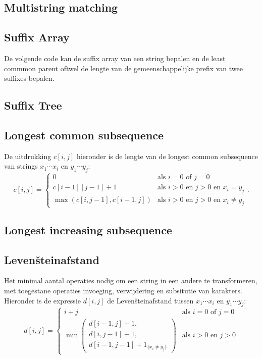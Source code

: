 \documentclass[10pt,a4paper,titlepage]{article}
\begin{document}


\subsection{Multistring matching}


\iftrue
\subsection{Suffix Array}

De volgende code kan de suffix array van een string bepalen en de least commmon parent oftwel de lengte van de gemeenschappelijke prefix van twee suffixes bepalen.



\subsection{Suffix Tree}



\subsection{Longest common subsequence}

De uitdrukking $c[i,j]$ hieronder is de lengte van de longest common subsequence van strings $x_1\cdots x_i$ en $y_1\cdots y_j$:
\[ c[i,j] = \left\{\begin{array}{ll}
0 & \text{als $i = 0$ of $j = 0$} \\
c[i-1][j-1] + 1 & \text{als $i > 0$ en $j > 0$ en $x_i = y_j$} \\
\max (c[i,j-1], c[i-1,j]) & \text{als $i > 0$ en $j > 0$ en $x_i \neq y_j$}
\end{array}\right. .
 \]

\subsection{Longest increasing subsequence}

\fi

\subsection{Levenšteinafstand}
Het minimal aantal operaties nodig om een string in een andere te transformeren, met toegestane operaties invoeging, verwijdering en subsitutie van karakters. Hieronder is de expressie $d[i,j]$ de Levenšteinafstand tussen $x_1\cdots x_i$ en $y_1\cdots y_j$:
\[ d[i,j] = \left\{\begin{array}{ll}
i+j & \text{als $i = 0$ of $j=0$} \\
\min\left(\begin{array}{c}d[i-1,j]+1,\\ d[i,j-1]+1,\\ d[i-1,j-1] + 1_{\{x_i \neq y_j\}}\end{array}\right) & \text{als $i > 0$ en $j>0$}
\end{array}\right.
\]
\end{document}
